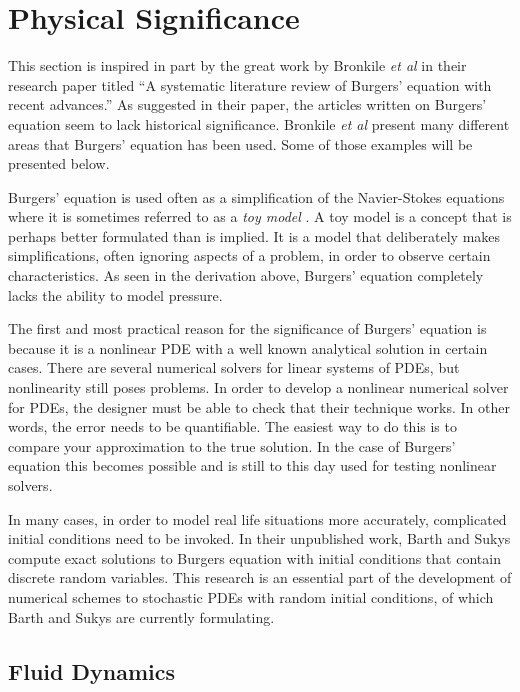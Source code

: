 \documentclass[undefended]{sfuthesis}
\begin{document}
\section{Physical Significance}
\label{sec:burgersEqPhysicalSignificance}

This section is inspired in part by the great work by Bronkile \textit{et al} \cite{burger1} in their research paper titled ``A systematic literature review of Burgers' equation with recent advances.'' As suggested in their paper, the articles written on Burgers' equation seem to lack historical significance. Bronkile \textit{et al} present many different areas that Burgers' equation has been used. Some of those examples will be presented below.

Burgers' equation is used often as a simplification of the Navier-Stokes equations where it is sometimes referred to as a \textit{toy model} \cite{burger2}. A toy model is a concept that is perhaps better formulated than is implied. It is a model that deliberately makes simplifications, often ignoring aspects of a problem, in order to observe certain characteristics. As seen in the derivation above, Burgers' equation completely lacks the ability to model pressure.

The first and most practical reason for the significance of Burgers' equation is because it is a nonlinear PDE with a well known analytical solution in certain cases. There are several numerical solvers for linear systems of PDEs, but nonlinearity still poses problems. In order to develop a nonlinear numerical solver for PDEs, the designer must be able to check that their technique works. In other words, the error needs to be quantifiable. The easiest way to do this is to compare your approximation to the true solution. In the case of Burgers' equation this becomes possible and is still to this day used for testing nonlinear solvers.

In many cases, in order to model real life situations more accurately, complicated initial conditions need to be invoked. In their unpublished work, Barth and Sukys \cite{nasa} compute exact solutions to Burgers equation with initial conditions that contain discrete random variables. This research is an essential part of the development of numerical schemes to stochastic PDEs with random initial conditions, of which Barth and Sukys are currently formulating.

\subsection{Fluid Dynamics}
\end{document}
